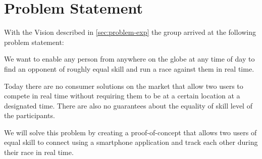 \section{Problem Statement}
With the Vision described in \autoref{sec:problem-exp} the group arrived at the following problem statement: 

We want to enable any person from anywhere on the globe at any time of day to find an opponent of roughly equal skill and run a race against them in real time. 

Today there are no consumer solutions on the market that allow two users to compete in real time without requiring them to be at a certain location at a designated time. There are also no guarantees about the equality of skill level of the participants.

We will solve this problem by creating a proof-of-concept that allows two users of equal skill to connect using a smartphone application and track each other during their race in real time.